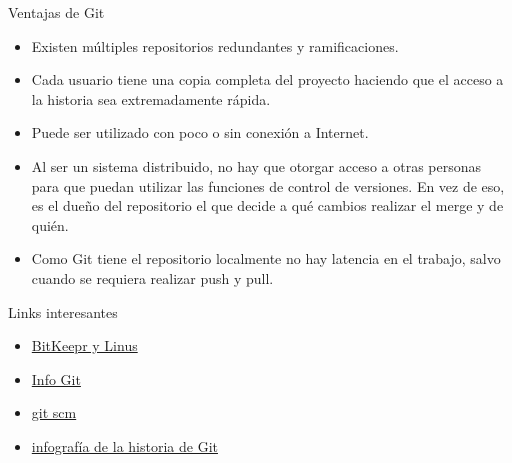 \documentclass{beamer}
\begin{document}
\begin{frame}{Ventajas de Git}
	\begin{itemize}
		\item Existen múltiples repositorios redundantes y ramificaciones.
		\item Cada usuario tiene una copia completa del proyecto haciendo que el acceso a la historia sea extremadamente rápida.
		\item Puede ser utilizado con poco o sin conexión a Internet.
		\item Al ser un sistema distribuido, no hay que otorgar acceso a otras personas para que puedan utilizar las funciones de control de versiones. En vez de eso, es el dueño del repositorio el que decide a qué cambios realizar el merge y de quién.
		\item Como Git tiene el repositorio localmente no hay latencia en el trabajo, salvo cuando se requiera
		realizar push y pull.
	\end{itemize}
\end{frame}

\begin{frame}[plain]{Links interesantes}
	\begin{itemize}
		\item \href{https://www.infoworld.com/article/2670360/linus-torvalds--bitkeeper-blunder.html}{BitKeepr y Linus}
		\item \href{https://www.conasa.es/blog/git-10-anos-controlando-versiones/}{Info Git}
		\item \href{https://git-scm.com}{git scm}
		\item \href{https://www.atlassian.com/git/articles/10-years-of-git}{infografía de la historia de Git}		
	\end{itemize}
	
	
\end{frame}
\end{document}

